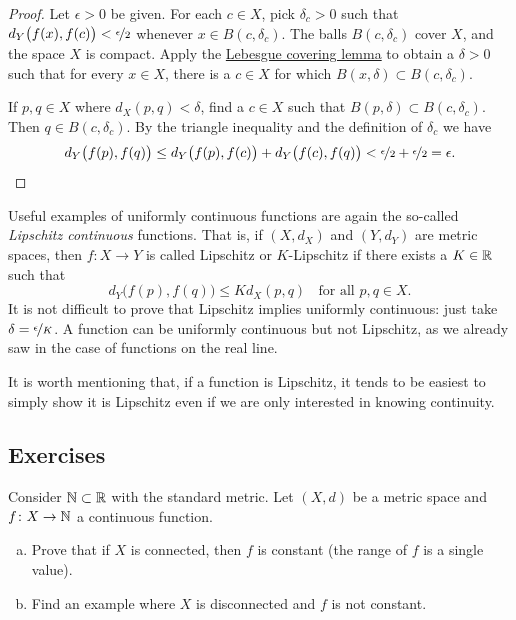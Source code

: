 \begin{proof}
Let $\epsilon > 0$ be given.  For each $c \in X$, pick $\delta_c > 0$ such that
$d_Y\bigl(f(x),f(c)\bigr) < \nicefrac{\epsilon}{2}$
whenever
$x \in B(c,\delta_c)$.
The balls
$B(c,\delta_c)$ cover $X$, and the space $X$ is compact.  
Apply the \hyperref[ms:lebesgue]{Lebesgue covering lemma} to obtain a 
$\delta > 0$ such that for every $x \in X$, there is a $c \in X$
for which $B(x,\delta) \subset B(c,\delta_c)$.

If $p, q \in X$ where $d_X(p,q) < \delta$,
find a $c \in X$ such that $B(p,\delta) \subset B(c,\delta_c)$.
Then $q \in B(c,\delta_c)$.  By the triangle inequality
and the definition of $\delta_c$ we have
\begin{equation*}
d_Y\bigl(f(p),f(q)\bigr)
\leq
d_Y\bigl(f(p),f(c)\bigr)
+
d_Y\bigl(f(c),f(q)\bigr)
<
\nicefrac{\epsilon}{2}+
\nicefrac{\epsilon}{2} = \epsilon .  \qedhere
\end{equation*}
\end{proof}

\begin{example}
Useful examples of uniformly continuous functions are again the so-called
\emph{Lipschitz continuous}%
%
functions.  That is, if
$(X,d_X)$ and $(Y,d_Y)$ are metric spaces, then $f \colon X \to Y$
is called Lipschitz or $K$-Lipschitz if there exists a $K \in {\mathbb{R}}$ such that
\begin{equation*}
d_Y\bigl(f(p),f(q)\bigr) \leq K d_X(p,q)
\ \ \ \ \text{for all } p,q \in X.
\end{equation*}
It is not difficult to prove that Lipschitz implies uniformly continuous:
just take $\delta = \nicefrac{\epsilon}{K}$.
A function can be uniformly continuous
but not Lipschitz,
as we already saw in the case
of functions on the real line.

It is worth mentioning that,
if a function is Lipschitz, it tends to be
easiest to simply show it is Lipschitz even if we are only
interested in knowing continuity.
\end{example}

\subsection{Exercises}

\begin{exercise}
Consider ${\mathbb{N}} \subset {\mathbb{R}}$ with the standard metric.  Let $(X,d)$ be a
metric space and $f \colon X \to {\mathbb{N}}$ a continuous function.
\begin{enumerate}[a)]
\item
Prove that if $X$ is connected,
then $f$ is constant (the range of $f$ is a single value).
\item
Find an example where $X$ is disconnected and $f$ is not constant.
\end{enumerate}
\end{exercise}

